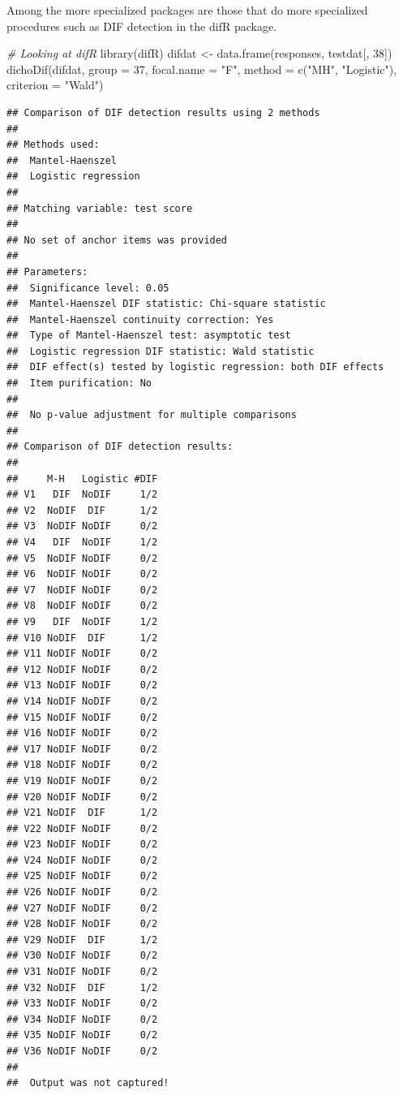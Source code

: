 \documentclass[
]{book}
\newenvironment{Shaded}{\begin{snugshade}}{\end{snugshade}}
\newcommand{\AttributeTok}[1]{\textcolor[rgb]{0.77,0.63,0.00}{#1}}
\newcommand{\CommentTok}[1]{\textcolor[rgb]{0.56,0.35,0.01}{\textit{#1}}}
\newcommand{\DecValTok}[1]{\textcolor[rgb]{0.00,0.00,0.81}{#1}}
\newcommand{\FunctionTok}[1]{\textcolor[rgb]{0.00,0.00,0.00}{#1}}
\newcommand{\NormalTok}[1]{#1}
\newcommand{\OtherTok}[1]{\textcolor[rgb]{0.56,0.35,0.01}{#1}}
\newcommand{\StringTok}[1]{\textcolor[rgb]{0.31,0.60,0.02}{#1}}
\begin{document}
Among the more specialized packages are those that do more specialized procedures such as DIF detection in the difR package.

\begin{Shaded}
\begin{Highlighting}[]
\CommentTok{\# Looking at difR}
\FunctionTok{library}\NormalTok{(difR)}
\NormalTok{difdat }\OtherTok{\textless{}{-}} \FunctionTok{data.frame}\NormalTok{(responses, testdat[, }\DecValTok{38}\NormalTok{])}
\FunctionTok{dichoDif}\NormalTok{(difdat, }\AttributeTok{group =} \DecValTok{37}\NormalTok{, }\AttributeTok{focal.name =} \StringTok{"F"}\NormalTok{, }\AttributeTok{method =} \FunctionTok{c}\NormalTok{(}\StringTok{"MH"}\NormalTok{, }\StringTok{"Logistic"}\NormalTok{), }\AttributeTok{criterion =} \StringTok{"Wald"}\NormalTok{)}
\end{Highlighting}
\end{Shaded}

\begin{verbatim}
## Comparison of DIF detection results using 2 methods 
##  
## Methods used: 
##  Mantel-Haenszel
##  Logistic regression
## 
## Matching variable: test score 
##  
## No set of anchor items was provided 
##  
## Parameters: 
##  Significance level: 0.05
##  Mantel-Haenszel DIF statistic: Chi-square statistic 
##  Mantel-Haenszel continuity correction: Yes 
##  Type of Mantel-Haenszel test: asymptotic test 
##  Logistic regression DIF statistic: Wald statistic 
##  DIF effect(s) tested by logistic regression: both DIF effects 
##  Item purification: No 
##  
##  No p-value adjustment for multiple comparisons 
##  
## Comparison of DIF detection results: 
##  
##     M-H   Logistic #DIF 
## V1   DIF  NoDIF     1/2 
## V2  NoDIF  DIF      1/2 
## V3  NoDIF NoDIF     0/2 
## V4   DIF  NoDIF     1/2 
## V5  NoDIF NoDIF     0/2 
## V6  NoDIF NoDIF     0/2 
## V7  NoDIF NoDIF     0/2 
## V8  NoDIF NoDIF     0/2 
## V9   DIF  NoDIF     1/2 
## V10 NoDIF  DIF      1/2 
## V11 NoDIF NoDIF     0/2 
## V12 NoDIF NoDIF     0/2 
## V13 NoDIF NoDIF     0/2 
## V14 NoDIF NoDIF     0/2 
## V15 NoDIF NoDIF     0/2 
## V16 NoDIF NoDIF     0/2 
## V17 NoDIF NoDIF     0/2 
## V18 NoDIF NoDIF     0/2 
## V19 NoDIF NoDIF     0/2 
## V20 NoDIF NoDIF     0/2 
## V21 NoDIF  DIF      1/2 
## V22 NoDIF NoDIF     0/2 
## V23 NoDIF NoDIF     0/2 
## V24 NoDIF NoDIF     0/2 
## V25 NoDIF NoDIF     0/2 
## V26 NoDIF NoDIF     0/2 
## V27 NoDIF NoDIF     0/2 
## V28 NoDIF NoDIF     0/2 
## V29 NoDIF  DIF      1/2 
## V30 NoDIF NoDIF     0/2 
## V31 NoDIF NoDIF     0/2 
## V32 NoDIF  DIF      1/2 
## V33 NoDIF NoDIF     0/2 
## V34 NoDIF NoDIF     0/2 
## V35 NoDIF NoDIF     0/2 
## V36 NoDIF NoDIF     0/2 
## 
##  Output was not captured!
\end{verbatim}
\end{document}
